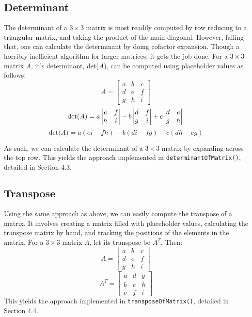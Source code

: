 \documentclass[12pt]{article}
\begin{document}
\subsection{Determinant}
The determinant of a $3\times3$ matrix is most readily computed by row reducing to a triangular matrix, and taking the product of the main diagonal. However, failing that, one can calculate the determinant by doing cofactor expansion. Though a horribly inefficient algorithm for larger matrices, it gets the job done. For a $3\times3$ matrix $A$, it's determinant, det($A$), can be computed using placeholder values as follows:
\[
A =
\begin{bmatrix}
    a & b & c \\
    d & e & f \\
    g & h & i
\end{bmatrix}
\]
\begin{equation*}
\text{det($A$)} =
  a\begin{vmatrix}
  e & f\\
  h & i
  \end{vmatrix}  
  -b\begin{vmatrix}
  d & f\\
  g & i
  \end{vmatrix}  
  +c\begin{vmatrix}
  d & e\\
  g & h
  \end{vmatrix}\\\\
\end{equation*}
\begin{equation}
\text{det($A$)} =
a(ei-fh)-b(di-fg)+c(dh-eg)
\end{equation}

As such, we can calculate the determinant of a $3\times3$ matrix by expanding across the top row. This yields the approach implemented in \texttt{determinantOfMatrix()}, detailed in Section 4.3.

\subsection{Transpose}
Using the same approach as above, we can easily compute the transpose of a matrix. It involves creating a matrix filled with placeholder values, calculating the transpose matrix by hand, and tracking the positions of the elements in the matrix. For a $3\times3$ matrix $A$, let its transpose be $A^T$. Then:
\[
A =
\begin{bmatrix}
    a & b & c \\
    d & e & f \\
    g & h & i
\end{bmatrix}
\]
\begin{equation}
A^T =
    \begin{bmatrix}
    a & d & g \\
    b & e & h \\
    c & f & i
\end{bmatrix}
\end{equation}
This yields the approach implemented in \texttt{transposeOfMatrix()}, detailed in Section 4.4.
\end{document}

